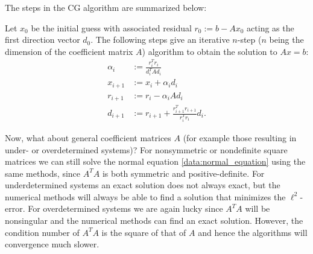     The steps in the CG algorithm are summarized below:
    \begin{method}
        Let $x_0$ be the initial guess with associated residual $r_0:=b-Ax_0$ acting as the first direction vector $d_0$. The following steps give an iterative $n$-step ($n$ being the dimension of the coefficient matrix $A$) algorithm to obtain the solution to $Ax=b$:
        \begin{align}
            \alpha_i &:= \frac{r_i^Tr_i}{d_i^TAd_i}\\
            x_{i+1} &:= x_i+\alpha_id_i\\
            r_{i+1} &:= r_i-\alpha_iAd_i\label{data:residual_recurrence}\\
            d_{i+1} &:= r_{i+1}+\frac{r_{i+1}^Tr_{i+1}}{r_i^Tr_i}d_i.\label{data:beta}
        \end{align}
    \end{method}


    Now, what about general coefficient matrices $A$ (for example those resulting in under- or overdetermined systems)? For nonsymmetric or nondefinite square matrices we can still solve the normal equation \ref{data:normal_equation} using the same methods, since $A^TA$ is both symmetric and positive-definite. For underdetermined systems an exact solution does not always exact, but the numerical methods will always be able to find a solution that minimizes the $\ell^2$-error. For overdetermined systems we are again lucky since $A^TA$ will be nonsingular and the numerical methods can find an exact solution. However, the condition number of $A^TA$ is the square of that of $A$ and hence the algorithms will convergence much slower.

